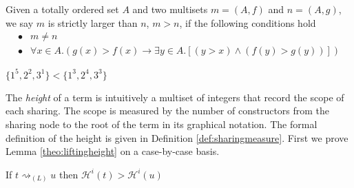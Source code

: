 \documentclass[a4paper,UKenglish,cleveref, autoref]{lipics-v2019}
\newcommand{\set}[1]{ \{ #1 \} }
\newcommand{\height}[2]{\mathcal{H}^{#1}(#2)}
\begin{document}
\begin{definition} Given a totally ordered set $A$ and two multisets $m = (A, f)$ and $n = (A, g)$, we say $m$ is strictly larger than $n$, $m > n$, if the following conditions hold
\begin{align*}
	\bullet & m \neq n \\
	\bullet & \forall x \in A. (g(x) > f(x) \rightarrow \exists y \in A.[ (y > x) \wedge (f(y) > g(y))] )
\end{align*}
\end{definition}

\begin{example}
$\set{1^{5}, 2^{2}, 3^{1}} < \set{1^{3}, 2^{4}, 3^{3}}$
\end{example}

The \emph{height} of a term is intuitively a multiset of integers that record the scope of each sharing. The scope is measured by the number of constructors from the sharing node to the root of the term in its graphical notation. The formal definition of the height is given in Definition \ref{def:sharingmeasure}. First we prove Lemma \ref{theo:liftingheight} on a case-by-case basis.

If $t \rightsquigarrow_{(L)} u$ then $\height{i}{t} > \height{i}{u}$
\end{document}
